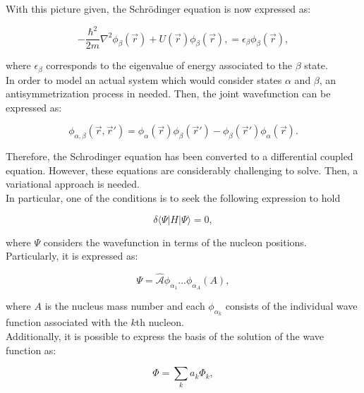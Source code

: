\documentclass[openany]{book}
\begin{document}
With this picture given, the Schrödinger equation is now expressed as: 

\begin{equation}\label{eq:micro_hartreeFock_schrodinger}
	-\frac{\hbar^2}{2m} \nabla^2 \phi_\beta(\vec r) + U(\vec r)  \phi_\beta(\vec r), = \epsilon_\beta  \phi_\beta(\vec r), 
\end{equation}

where $\epsilon_\beta$ corresponds to the eigenvalue of energy associated to the $\beta$ state. \\

In order to model an actual system which would consider states $\alpha$ and $\beta$, an antisymmetrization process in needed. Then, the joint wavefunction can be expressed as: 

\begin{equation}\label{eq:micro_hartreeFock_antisymmetrization}
	\phi_{\alpha, \beta}(\vec r, \vec r') = \phi_\alpha (\vec r) \phi_\beta  (\vec r' ) - \phi_\beta (\vec r') \phi_\alpha  (\vec r ). 
\end{equation}

Therefore, the Schrodinger equation has been converted to a differential coupled equation. However, these equations are considerably challenging to solve. Then, a variational approach is needed. \\

In particular, one of the conditions is to seek the following expression to hold

\begin{equation} \label{eq:micro_hartreeFock_optimal}
	\delta \langle \Psi | H | \Psi \rangle = 0,
\end{equation}

where $\Psi$ considers the wavefunction in terms of the nucleon positions. Particularly, it is expressed as: 

\begin{equation} \label{eq:micro_hartreeFock_Psi}
	\Psi = \hat{\mathcal{A}}  \phi_{\alpha_1} ...  \phi_{\alpha_A} (A),
\end{equation}

where $A$ is the nucleus mass number and each $\phi_{\alpha_k}$ consists of the individual wave function associated with the $k$th nucleon. \\

Additionally, it is possible to express the basis of the solution of the wave function as: 

\begin{equation} \label{eq:micro_hartreeFock_basis}
	\Phi = \sum_{k} a_k \Phi_k,
\end{equation}
\end{document}
